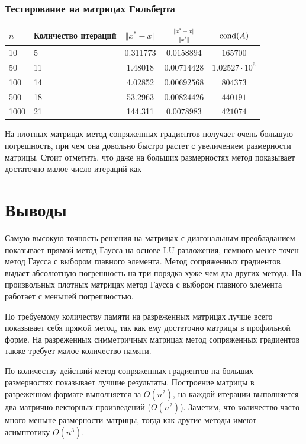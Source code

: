\documentclass[english]{article}
\begin{document}
\subsubsection{Тестирование на матрицах Гильберта}
\begin{center}
  \begin{longtable}{l|l|c|c|c}
    \(n\) & Количество итераций & \(\Vert x^* - x \Vert\) & \(\frac{\Vert x^* - x \Vert}{\Vert x^* \Vert}\) & \(\mathop{\rm cond}(A) \)\\
    \hline
    10 & 5 & 0.311773 & \(0.0158894\) & \(165700\) \\
    50 & 11 & 1.48018 & \(0.00714428\) & \(1.02527 \cdot 10^{6}\) \\
    100 & 14 & 4.02852 & \(0.00692568\) & \(804373\) \\
    500 & 18 & 53.2963 & \(0.00824426\) & \(440191\) \\
    1000 & 21 & 144.311 & \(0.0078983\) & \(421074\)
  \end{longtable}
\end{center}
На плотных матрицах метод сопряженных градиентов получает очень
большую погрешность, при чем она довольно быстро растет с увеличением
размерности матрицы. Стоит отметить, что даже на больших размерностях
метод показывает достаточно малое число итераций как
\section{Выводы}
Самую высокую точность решения на матрицах с диагональным
преобладанием показывает прямой метод Гаусса на основе LU-разложения,
немного менее точен метод Гаусса с выбором главного элемента. Метод
сопряженных градиентов выдает абсолютную погрешность на три порядка
хуже чем два других метода. На произвольных плотных матрицах метод
Гаусса с выбором главного элемента работает с меньшей погрешностью.

По требуемому количеству памяти на разреженных матрицах лучше всего
показывает себя прямой метод, так как ему достаточно матрицы в
профильной форме. На разреженных симметричных матрицах метод
сопряженных градиентов также требует малое количество памяти.

По количеству действий метод сопряженных градиентов на больших
размерностях показывает лучшие результаты. Построение матрицы в
разреженном формате выполняется за \(O(n^2)\), на каждой итерации
выполняется два матрично векторных произведений (\(O(n^2)\)). Заметим,
что количество часто много меньше размерности матрицы, тогда как
другие методы имеют асимптотику \(O(n^3)\).
\end{document}
